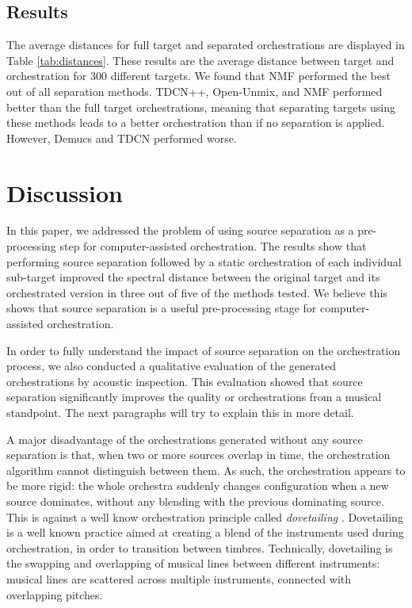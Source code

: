 \documentclass{article}
\begin{document}
  
    \subsection{Results}
    The average distances for full target and separated orchestrations are displayed in Table \ref{tab:distances}. These results are the average distance between target and orchestration for 300 different targets. We found that NMF performed the best out of all separation methods. TDCN++, Open-Unmix, and NMF performed better than the full target orchestrations, meaning that separating targets using these methods leads to a better orchestration than if no separation is applied. However, Demucs and TDCN performed worse.
  
  \section{Discussion}\label{sec:discussion}
  In this paper, we addressed the problem of using source separation as a pre-processing step for computer-assisted orchestration. The results show that performing source separation followed by a static orchestration of each individual sub-target improved the spectral distance between the original target and its orchestrated version in three out of five of the methods tested. We believe this shows that source separation is a useful pre-processing stage for computer-assisted orchestration. 
  
  In order to fully understand the impact of source separation on the orchestration process, we also conducted a qualitative evaluation of the generated orchestrations by acoustic inspection.
This evaluation showed that source separation significantly improves the quality or orchestrations from a musical standpoint. The next paragraphs will try to explain this in more detail.

	A major disadvantage of the orchestrations generated without any source separation is that, when two or more sources overlap in time, the orchestration algorithm cannot distinguish between them. As such, the orchestration appears to be more rigid: the whole orchestra suddenly changes configuration when a new source dominates, without any blending with the previous dominating source. This is against a well know orchestration principle called \emph{dovetailing} \cite[pp. 467-473]{Adler2016}. Dovetailing is a well known practice aimed at creating a blend of the instruments used during orchestration, in order to transition between timbres. Technically, dovetailing is the swapping and overlapping of musical lines between different instruments: musical lines are scattered across multiple instruments, connected with overlapping pitches.
\end{document}
